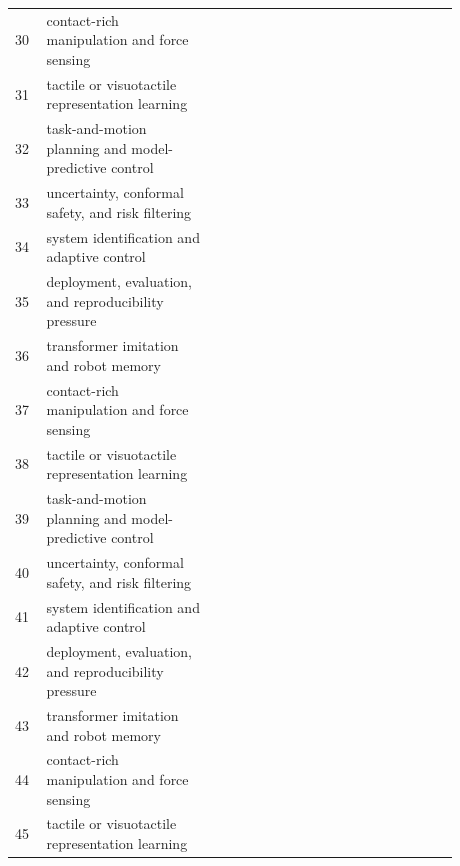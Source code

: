 \documentclass{article}
\begin{document}
\begin{longtable}{p{0.06\linewidth}p{0.34\linewidth}p{0.48\linewidth}}
30 & contact-rich manipulation and force sensing & \citep{cong2023reltr88,lygerakis2025vitapes89,sapkota2011object90} \\
31 & tactile or visuotactile representation learning & \citep{fime2024automatic91,kang2019visual92,bai2023surgicalvqlatransformer93} \\
32 & task-and-motion planning and model-predictive control & \citep{papantonakis2024reducing94,keskar2025evaluating95,jia2023hdgt96} \\
33 & uncertainty, conformal safety, and risk filtering & \citep{zhang2021rest97,lee2025dinomot98,delfin2018humanoid99} \\
34 & system identification and adaptive control & \citep{kapusi2025scara100,liu2019mesoscale101,gao2023memotr102} \\
35 & deployment, evaluation, and reproducibility pressure & \citep{li2022transformer103,li2022sctn104,wang2024h2gformer105} \\
36 & transformer imitation and robot memory & \citep{jenmalm2000visual106,lv2024sgformer107,zhou2025evaluating108} \\
37 & contact-rich manipulation and force sensing & \citep{wang2025random109,qiu2025transforming110,papa2024a111} \\
38 & tactile or visuotactile representation learning & \citep{liang2022detectformer112,im2024egtr113,xu2023imagebased114} \\
39 & task-and-motion planning and model-predictive control & \citep{zhang2025crossscene115,zhang2025msslam116,li2023a117} \\
40 & uncertainty, conformal safety, and risk filtering & \citep{liu2024augmenting118,li2022sgtr119,zhang2023boosting120} \\
41 & system identification and adaptive control & \citep{xu2023demt121,dehghani2023scaling122,jalal2021scene123} \\
42 & deployment, evaluation, and reproducibility pressure & \citep{cheng2022tallformer124,chen2021positionforce125,ulloa2020soft126} \\
43 & transformer imitation and robot memory & \citep{alhamd2024advanced127,gao2025memoryaugment128,ren2023a129} \\
44 & contact-rich manipulation and force sensing & \citep{shavit2021learning130,khan2023a131,cong2021spatialtemporal132} \\
45 & tactile or visuotactile representation learning & \citep{wang2022advancing133,shi2020are134,yang2021transformerssklearn135} \\

\end{longtable}
\end{document}
